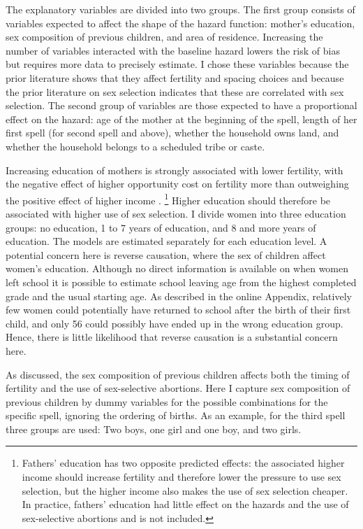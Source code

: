 \documentclass[12pt,letterpaper]{article}
\begin{document}
The explanatory variables are divided into two groups.
The first group consists of variables expected to affect the shape of the hazard function: 
mother's education, sex composition of previous children, and area of residence.
Increasing the number of variables interacted with the baseline hazard lowers the risk 
of bias but requires more data to precisely estimate.
I chose these variables because the prior literature shows that they affect 
fertility and spacing choices and because the prior literature on sex selection indicates 
that these are correlated with sex selection.
The second group of variables are those expected to have a proportional effect on the 
hazard: age of the mother at the beginning of the spell, length of her first spell 
(for second spell and above), whether the household owns land, and whether the household 
belongs to a scheduled tribe or caste.

Increasing education of mothers is strongly associated with lower fertility, with
the negative effect of higher opportunity cost on fertility more than outweighing the 
positive effect of higher income \citep{schultz97}.%
\footnote{
Fathers' education has two opposite predicted effects: the associated higher income
should increase fertility and therefore lower the pressure to use sex selection, but
the higher income also makes the use of sex selection cheaper.
In practice, fathers' education had little effect on the hazards and the use of 
sex-selective abortions and is not included.
}
Higher education should therefore be associated with higher use of sex selection.
I divide women into three education groups:
no education, 1 to 7 years of education, and 8 and more years of education.
The models are estimated separately for each education level.
A potential concern here is reverse causation, where the sex of children
affect women's education.
Although no direct information is available on when women left school it is
possible to estimate school leaving age from the highest completed grade
and the usual starting age.
As described in the online Appendix, relatively few women could potentially 
have returned to school after the birth of their first child,
and only 56 could possibly have ended up in the wrong education group. 
Hence, there is little likelihood that reverse causation is a substantial
concern here.

As discussed, the sex composition of previous children affects both the timing
of fertility and the use of sex-selective abortions.
Here I capture sex composition of previous children by dummy variables for the
possible combinations for the specific spell, ignoring the ordering of births.
As an example, for the third spell three groups are used: Two boys,
one girl and one boy, and two girls.
\end{document}
